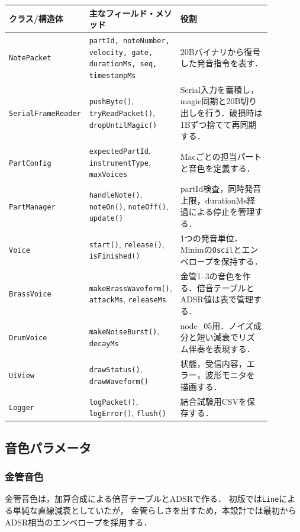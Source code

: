 \documentclass[a4paper,11pt]{jsarticle}
\begin{document}
\begin{longtable}{p{0.21\linewidth}p{0.31\linewidth}p{0.36\linewidth}}
\toprule
クラス/構造体 & 主なフィールド・メソッド & 役割 \\
\midrule
\endhead
\texttt{NotePacket} &
\texttt{partId, noteNumber, velocity, gate, durationMs, seq, timestampMs} &
20Bバイナリから復号した発音指令を表す． \\
\texttt{SerialFrameReader} &
\texttt{pushByte()}, \texttt{tryReadPacket()}, \texttt{dropUntilMagic()} &
Serial入力を蓄積し，magic同期と20B切り出しを行う．破損時は1Bずつ捨てて再同期する． \\
\texttt{PartConfig} &
\texttt{expectedPartId}, \texttt{instrumentType}, \texttt{maxVoices} &
Macごとの担当パートと音色を定義する． \\
\texttt{PartManager} &
\texttt{handleNote()}, \texttt{noteOn()}, \texttt{noteOff()}, \texttt{update()} &
partId検査，同時発音上限，durationMs経過による停止を管理する． \\
\texttt{Voice} &
\texttt{start()}, \texttt{release()}, \texttt{isFinished()} &
1つの発音単位．Minimの\texttt{Oscil}とエンベロープを保持する． \\
\texttt{BrassVoice} &
\texttt{makeBrassWaveform()}, \texttt{attackMs}, \texttt{releaseMs} &
金管1--3の音色を作る．倍音テーブルとADSR値は表で管理する． \\
\texttt{DrumVoice} &
\texttt{makeNoiseBurst()}, \texttt{decayMs} &
node\_05用．ノイズ成分と短い減衰でリズム伴奏を表現する． \\
\texttt{UiView} &
\texttt{drawStatus()}, \texttt{drawWaveform()} &
状態，受信内容，エラー，波形モニタを描画する． \\
\texttt{Logger} &
\texttt{logPacket()}, \texttt{logError()}, \texttt{flush()} &
結合試験用CSVを保存する． \\
\bottomrule
\end{longtable}

\subsection{音色パラメータ}

\subsubsection{金管音色}

金管音色は，加算合成による倍音テーブルとADSRで作る．
初版では\texttt{Line}による単純な直線減衰としていたが，
金管らしさを出すため，本設計では最初からADSR相当のエンベロープを採用する．
\end{document}
